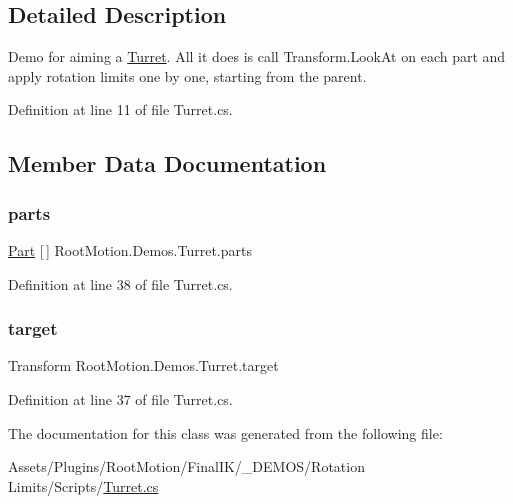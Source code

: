 \subsection{Detailed Description}
Demo for aiming a \mbox{\hyperlink{class_root_motion_1_1_demos_1_1_turret}{Turret}}. All it does is call Transform.\+Look\+At on each part and apply rotation limits one by one, starting from the parent. 



Definition at line 11 of file Turret.\+cs.



\subsection{Member Data Documentation}
\mbox{\label{class_root_motion_1_1_demos_1_1_turret_ac1add03df335ff19b61e39f351c21d64}} 
\subsubsection{\texorpdfstring{parts}{parts}}
{\footnotesize\ttfamily \mbox{\hyperlink{class_root_motion_1_1_demos_1_1_turret_1_1_part}{Part}} \mbox{[}$\,$\mbox{]} Root\+Motion.\+Demos.\+Turret.\+parts}



Definition at line 38 of file Turret.\+cs.

\mbox{\label{class_root_motion_1_1_demos_1_1_turret_a5dac9143646347dc9376b707e13556c5}} 
\subsubsection{\texorpdfstring{target}{target}}
{\footnotesize\ttfamily Transform Root\+Motion.\+Demos.\+Turret.\+target}



Definition at line 37 of file Turret.\+cs.



The documentation for this class was generated from the following file\+:\begin{DoxyCompactItemize}
\item 
Assets/\+Plugins/\+Root\+Motion/\+Final\+I\+K/\+\_\+\+D\+E\+M\+O\+S/\+Rotation Limits/\+Scripts/\mbox{\hyperlink{_turret_8cs}{Turret.\+cs}}\end{DoxyCompactItemize}
